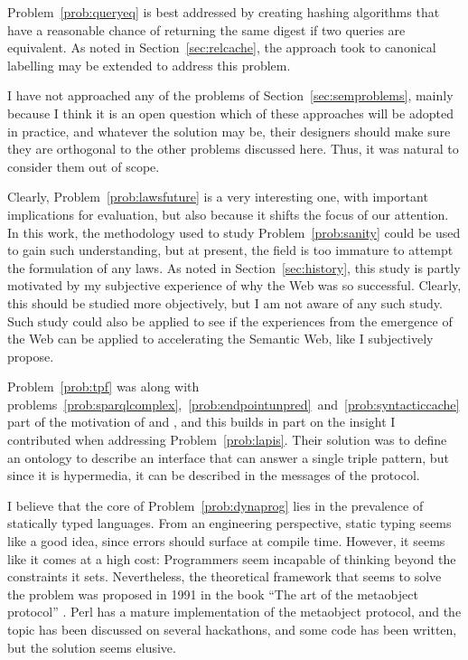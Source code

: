 
Problem~\ref{prob:queryeq} is best addressed by creating hashing
algorithms that have a reasonable chance of returning the same digest
if two queries are equivalent. As noted in Section~\ref{sec:relcache},
the approach \cite{papailiou2015graph} took to canonical labelling may
be extended to address this problem.

I have not approached any of the problems of
Section~\ref{sec:semproblems}, mainly because I think it is an open
question which of these approaches will be adopted in practice, and
whatever the solution may be, their designers should make sure they
are orthogonal to the other problems discussed here. Thus, it was
natural to consider them out of scope. 

Clearly, Problem~\ref{prob:lawsfuture} is a very interesting one, with
important implications for evaluation, but also because it shifts the
focus of our attention. In this work, the methodology used to study
Problem~\ref{prob:sanity} could be used to gain such understanding,
but at present, the field is too immature to attempt the formulation
of any laws. As noted in Section~\ref{sec:history}, this study is
partly motivated by my subjective experience of why the Web was so
successful. Clearly, this should be studied more objectively, but I am
not aware of any such study. Such study could also be applied to see
if the experiences from the emergence of the Web can be applied to
accelerating the Semantic Web, like I subjectively propose.

Problem~\ref{prob:tpf} was along with
problems~\ref{prob:sparqlcomplex},~\ref{prob:endpointunpred}~and~\ref{prob:syntacticcache}
part of the motivation of \cite{ldf1} and \cite{verborgh2014querying},
and this builds in part on the insight I contributed when addressing
Problem~\ref{prob:lapis}. Their solution was to define an ontology to
describe an interface that can answer a single triple pattern, but
since it is hypermedia, it can be described in the messages of the
protocol.

I believe that the core of Problem~\ref{prob:dynaprog} lies in the
prevalence of statically typed languages. From an engineering
perspective, static typing seems like a good idea, since errors should
surface at compile time. However, it seems like it comes at a high
cost: Programmers seem incapable of thinking beyond the constraints it
sets. Nevertheless, the theoretical framework that seems to solve the
problem was proposed in 1991 in the book ``The art of the metaobject
protocol'' \cite{kiczales1991art}. Perl has a mature implementation of
the metaobject protocol, and the topic has been discussed on several
hackathons, and some code has been written, but the solution seems
elusive.
